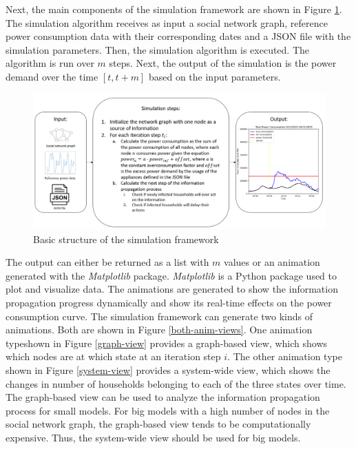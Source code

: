 Next, the main components of the simulation framework are shown
in Figure \ref{simframework}.
The simulation algorithm receives as input a social 
network graph, reference power consumption data with their 
corresponding dates and 
a JSON file with the simulation parameters. 
Then, the simulation algorithm is executed.
The algorithm is run over
$m$ steps. Next, the output of the simulation is the 
power demand over the time $[t, t+m]$ based on the
input parameters.

\begin{figure}[!ht]
    \center
    \includegraphics[scale=.66]{figs/Simulation-framework.png}
    \caption{Basic structure of the simulation framework}
    \label{simframework}
\end{figure}

The output can either be returned as a list with $m$ values
or an animation generated with the \textit{Matplotlib} package.
\textit{Matplotlib} is a Python package used to plot and visualize 
data. The animations are generated to show the information propagation
progress dynamically and show its real-time effects on the power
consumption curve. The simulation framework can generate two 
kinds of animations. Both are shown in Figure \ref{both-anim-views}.
One animation typeshown in Figure \ref{graph-view}
provides a graph-based view, which 
shows which nodes are at which state at an iteration step $i$.
The other animation type shown in Figure \ref{system-view}
provides a system-wide view, which shows
the changes in number of households belonging to each of the three
states over time.
The graph-based view can be used to analyze the information propagation
process for small models. For big models with a high number of nodes
in the social network graph, the graph-based view tends to be 
computationally expensive. Thus, the system-wide view should be used
for big models.


